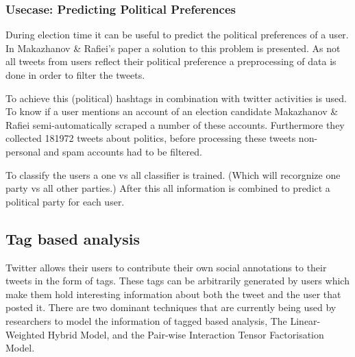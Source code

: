 \documentclass{article}
\begin{document}
\subsubsection{Usecase: Predicting Political Preferences}
During election time it can be useful to predict the political preferences of a user. In Makazhanov \& Raﬁei's paper a solution to this problem is presented. As not all tweets from users reflect their political preference a preprocessing of data is done in order to filter the tweets. \cite{pol}

To achieve this (political) hashtags in combination with twitter activities is used. To know if a user mentions an account of an election candidate Makazhanov \& Raﬁei semi-automatically scraped a number of these accounts. Furthermore they collected 181972 tweets about politics, before processing these tweets non-personal and spam accounts had to be filtered. \cite{pol}

To classify the users a one vs all classifier is trained. (Which will recorgnize one party vs all other parties.) After this all information is combined to predict a political party for each user. 
\subsection{Tag based analysis}

Twitter allows their users to contribute their own social annotations to their tweets in the form of tags. These tags can be arbitrarily generated by users 
which make them hold interesting information about both the tweet and the user that posted it. There are two dominant techniques that are currently being
used by researchers to model the information of tagged based analysis, The Linear-Weighted Hybrid Model, and the Pair-wise Interaction Tensor Factorisation Model\cite{TagBased}.
\end{document}

